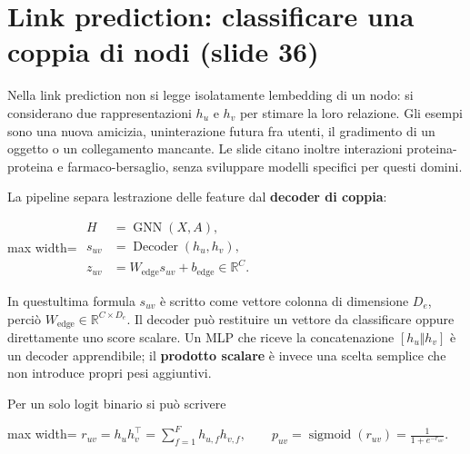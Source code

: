 \documentclass[11pt,a4paper,oneside,openany]{book}
\begin{document}
\section{Link prediction: classificare una coppia di nodi (slide 36)}\label{f05-n30-r656}

Nella link prediction non si legge isolatamente l\textquotesingle embedding di un nodo: si considerano due rappresentazioni \(h_u\) e \(h_v\) per stimare la loro relazione. Gli esempi sono una nuova amicizia, un\textquotesingle interazione futura fra utenti, il gradimento di un oggetto o un collegamento mancante. Le slide citano inoltre interazioni proteina-proteina e farmaco-bersaglio, senza sviluppare modelli specifici per questi domini.

La pipeline separa l\textquotesingle estrazione delle feature dal \textbf{decoder di coppia}:

\begin{center}
\begin{adjustbox}{max width=\linewidth}
$\displaystyle \begin{aligned}
H&=\operatorname{GNN}(X,A),\\
s_{uv}&=\operatorname{Decoder}(h_u,h_v),\\
z_{uv}&=W_{\mathrm{edge}}s_{uv}+b_{\mathrm{edge}}\in\mathbb R^C.
\end{aligned}$
\end{adjustbox}
\end{center}

In quest\textquotesingle ultima formula \(s_{uv}\) è scritto come vettore colonna di dimensione \(D_e\), perciò \(W_{\mathrm{edge}}\in\mathbb R^{C\times D_e}\). Il decoder può restituire un vettore da classificare oppure direttamente uno score scalare. Un MLP che riceve la concatenazione \([h_u\Vert h_v]\) è un decoder apprendibile; il \textbf{prodotto scalare} è invece una scelta semplice che non introduce propri pesi aggiuntivi.

Per un solo logit binario si può scrivere

\begin{center}
\begin{adjustbox}{max width=\linewidth}
$\displaystyle \boxed{r_{uv}=h_uh_v^\top=\sum_{f=1}^Fh_{u,f}h_{v,f},\qquad
p_{uv}=\operatorname{sigmoid}(r_{uv})=\frac1{1+e^{-r_{uv}}}.}$
\end{adjustbox}
\end{center}
\end{document}
